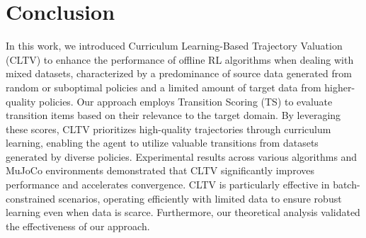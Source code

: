 \section{Conclusion}
\label{sec:conclusion}
In this work, we introduced Curriculum Learning-Based Trajectory Valuation (CLTV) to enhance the performance of offline RL algorithms when dealing with mixed datasets, characterized by a predominance of source data generated from random or suboptimal policies and a limited amount of target data from higher-quality policies. Our approach employs Transition Scoring (TS) to evaluate transition items based on their relevance to the target domain. By leveraging these scores, CLTV prioritizes high-quality trajectories through curriculum learning, enabling the agent to utilize valuable transitions from datasets generated by diverse policies. Experimental results across various algorithms and MuJoCo environments demonstrated that CLTV significantly improves performance and accelerates convergence. CLTV is particularly effective in batch-constrained scenarios, operating efficiently with limited data to ensure robust learning even when data is scarce. Furthermore, our theoretical analysis validated the effectiveness of our approach.